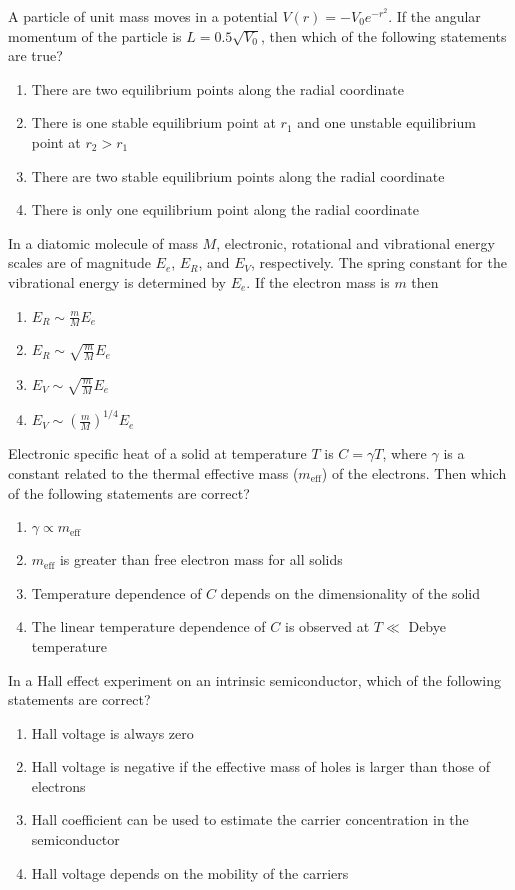     \item A particle of unit mass moves in a potential $ V(r) = -V_0 e^{-r^2} $. If the angular momentum of the particle is $ L = 0.5 \sqrt{V_0} $, then which of the following statements are true?
    \begin{enumerate}
        \item There are two equilibrium points along the radial coordinate
        \item There is one stable equilibrium point at $ r_1 $ and one unstable equilibrium point at $ r_2 > r_1 $
        \item There are two stable equilibrium points along the radial coordinate
        \item There is only one equilibrium point along the radial coordinate
    \end{enumerate}
    \item In a diatomic molecule of mass $ M $, electronic, rotational and vibrational energy scales are of magnitude $ E_e $, $ E_R $, and $ E_V $, respectively. The spring constant for the vibrational energy is determined by $ E_e $. If the electron mass is $ m $ then
    \begin{enumerate}
        \item $ E_R \sim \frac{m}{M} E_e $
        \item $ E_R \sim \sqrt{\frac{m}{M}} E_e $
        \item $ E_V \sim \sqrt{\frac{m}{M}} E_e $
        \item $ E_V \sim \left( \frac{m}{M} \right)^{1/4} E_e $
    \end{enumerate}

    \item Electronic specific heat of a solid at temperature $ T $ is $ C = \gamma T $, where $ \gamma $ is a constant related to the thermal effective mass ($ m_{\text{eff}} $) of the electrons. Then which of the following statements are correct?
    \begin{enumerate}
        \item $ \gamma \propto m_{\text{eff}} $
        \item $ m_{\text{eff}} $ is greater than free electron mass for all solids
        \item Temperature dependence of $ C $ depends on the dimensionality of the solid
        \item The linear temperature dependence of $ C $ is observed at $ T \ll $ Debye temperature
    \end{enumerate}
    \item In a Hall effect experiment on an intrinsic semiconductor, which of the following statements are correct?
    \begin{enumerate}
        \item Hall voltage is always zero
        \item Hall voltage is negative if the effective mass of holes is larger than those of electrons
        \item Hall coefficient can be used to estimate the carrier concentration in the semiconductor
        \item Hall voltage depends on the mobility of the carriers
    \end{enumerate}

